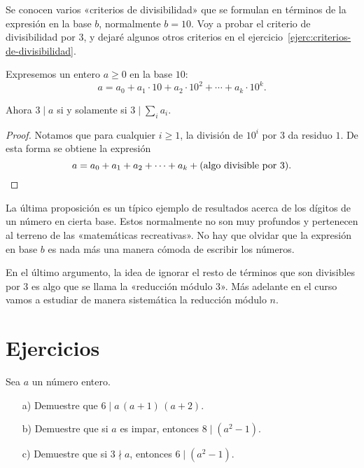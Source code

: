 Se conocen varios «criterios de divisibilidad» que se formulan en términos de la
expresión en la base $b$, normalmente $b = 10$. Voy a probar el criterio de
divisibilidad por $3$, y dejaré algunos otros criterios en el
ejercicio~\ref{ejerc:criterios-de-divisibilidad}.

\begin{proposicion}
  Expresemos un entero $a \ge 0$ en la base $10$:
  $$a = a_0 + a_1\cdot 10 + a_2\cdot 10^2 + \cdots + a_k\cdot 10^k.$$

  Ahora $3\mid a$ si y solamente si $3 \mid \sum_i a_i$.

  \begin{proof}
    Notamos que para cualquier $i \ge 1$, la división de $10^i$ por $3$ da
    residuo $1$. De esta forma se obtiene la expresión
    \[ a = a_0 + a_1 + a_2 + \cdots + a_k + (\text{algo divisible por }3). \qedhere \]
  \end{proof}
\end{proposicion}

La última proposición es un típico ejemplo de resultados acerca de los dígitos
de un número en cierta base. Estos normalmente no son muy profundos y pertenecen
al terreno de las «matemáticas recreativas». No hay que olvidar que la expresión
en base $b$ es nada más una manera cómoda de escribir los números.

En el último argumento, la idea de ignorar el resto de términos que son
divisibles por $3$ es algo que se llama la «reducción módulo $3$». Más adelante
en el curso vamos a estudiar de manera sistemática la reducción módulo $n$.


\pagebreak
\section{Ejercicios}

\begin{ejercicio}
  Sea $a$ un número entero.

  \begin{enumerate}
  \item[a)] Demuestre que $6 \mid a\,(a+1)\,(a+2)$.

  \item[b)] Demuestre que si $a$ es impar, entonces $8 \mid (a^2 - 1)$.

  \item[c)] Demuestre que si $3\nmid a$, entonces $6 \mid (a^2 - 1)$.
  \end{enumerate}
\end{ejercicio}

